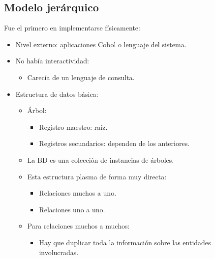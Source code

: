 \subsection{Modelo jerárquico}

Fue el primero en implementarse físicamente:
\begin{itemize}
    \item Nivel externo: aplicaciones Cobol o lenguaje del sistema.
    \item No había interactividad:
    \begin{itemize}
        \item Carecía de un lenguaje de consulta.
    \end{itemize}
    \item Estructura de datos básica:
    \begin{itemize}
        \item Árbol:
        \begin{itemize}
            \item Registro maestro: raíz.
            \item Registros secundarios: dependen de los anteriores.
        \end{itemize}
    \end{itemize}
    \begin{itemize}
        \item La BD es una colección de instancias de árboles.
        \item Esta estructura plasma de forma muy directa:
        \begin{itemize}
            \item Relaciones muchos a uno.
            \item Relaciones uno a uno.
        \end{itemize}
        \item Para relaciones muchos a muchos:
        \begin{itemize}
            \item Hay que duplicar toda la información sobre las entidades involucradas.
        \end{itemize}
    \end{itemize}
\end{itemize}